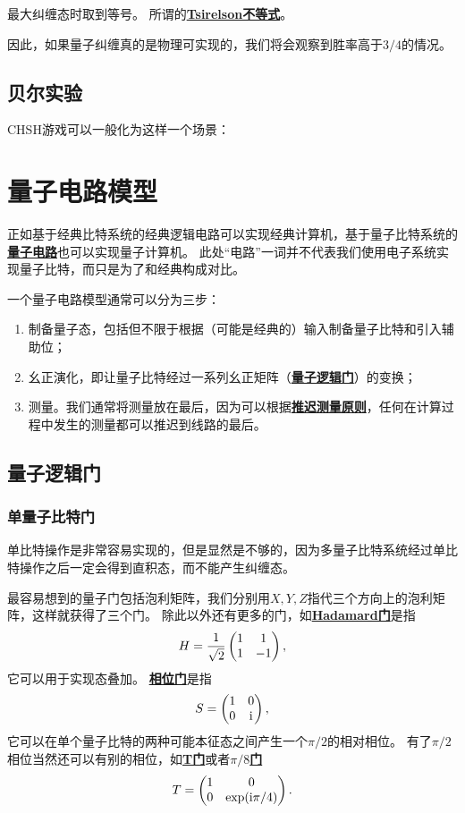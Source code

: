 \documentclass[hyperref, UTF8, a4paper]{ctexart}
\newcommand*{\ii}{\mathrm{i}}
\newcommand*{\concept}[1]{\underline{\textbf{#1}}}
\begin{document}
最大纠缠态时取到等号。
所谓的\concept{Tsirelson不等式}。

因此，如果量子纠缠真的是物理可实现的，我们将会观察到胜率高于$3/4$的情况。

\subsection{贝尔实验}

CHSH游戏可以一般化为这样一个场景：

\section{量子电路模型}

正如基于经典比特系统的经典逻辑电路可以实现经典计算机，基于量子比特系统的\concept{量子电路}也可以实现量子计算机。
此处“电路”一词并不代表我们使用电子系统实现量子比特，而只是为了和经典构成对比。

一个量子电路模型通常可以分为三步：
\begin{enumerate}
    \item 制备量子态，包括但不限于根据（可能是经典的）输入制备量子比特和引入辅助位；
    \item 幺正演化，即让量子比特经过一系列幺正矩阵（\concept{量子逻辑门}）的变换；
    \item 测量。我们通常将测量放在最后，因为可以根据\concept{推迟测量原则}，任何在计算过程中发生的测量都可以推迟到线路的最后。
\end{enumerate}

\subsection{量子逻辑门}

\subsubsection{单量子比特门}

单比特操作是非常容易实现的，但是显然是不够的，因为多量子比特系统经过单比特操作之后一定会得到直积态，而不能产生纠缠态。

最容易想到的量子门包括泡利矩阵，我们分别用$X, Y, Z$指代三个方向上的泡利矩阵，这样就获得了三个门。
除此以外还有更多的门，如\concept{Hadamard门}是指
\begin{equation}
    H = \frac{1}{\sqrt{2}} \pmqty{1 & 1 \\ 1 & -1},
\end{equation}
它可以用于实现态叠加。
\concept{相位门}是指
\begin{equation}
    S = \pmqty{1 & 0 \\ 0 & \ii},
\end{equation}
它可以在单个量子比特的两种可能本征态之间产生一个$\pi/2$的相对相位。
有了$\pi/2$相位当然还可以有别的相位，如\concept{T门}或者\concept{$\pi/8$门}
\begin{equation}
    T = \pmqty{1 & 0 \\ 0 & \exp(\ii \pi / 4)}.
\end{equation}
\end{document}
